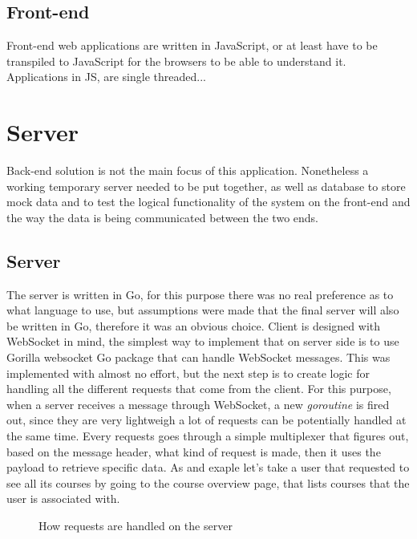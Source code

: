 \subsection{Front-end}
Front-end web applications are written in JavaScript, or at least have to be transpiled to JavaScript for the browsers to be able to understand it. Applications in JS, are single threaded...

\section{Server}
Back-end solution is not the main focus of this application. Nonetheless a working temporary server needed to be put together, as well as database to store mock data and to test the logical functionality of the system on the front-end and the way the data is being communicated between the two ends.
\subsection{Server}
The server is written in Go, for this purpose there was no real  preference as to what language to use, but assumptions were made that the final server will also be written in Go, therefore it was an obvious choice. Client is designed with WebSocket in mind, the simplest way to implement that on server side is to use Gorilla websocket Go package that can handle WebSocket messages. This was implemented with almost no effort, but the next step is to create logic for handling all the different requests that come from the client. For this purpose, when a server receives a message through WebSocket, a new \emph{goroutine} is fired out, since they are very lightweigh a lot of requests can be potentially handled at the same time. Every requests goes through a simple multiplexer that figures out, based on the message header, what kind of request is made, then it uses the payload to retrieve specific data. As and exaple let's take a user that requested to see all its courses by going to the course overview page, that lists courses that the user is associated with.

\begin{figure}[h]
  
  \caption{How requests are handled on the server}
  \label{fig:serverwebsocket}
\end{figure}

